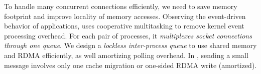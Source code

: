 

To handle many concurrent connections efficiently, we need to save memory footprint and improve locality of memory accesses. Observing the event-driven behavior of applications, \sys uses cooperative multitasking to remove kernel event processing overhead. For each pair of processes, it \textit{multiplexes socket connections through one queue}. We design a \textit{lockless inter-process queue} to use shared memory and RDMA efficiently, as well amortizing polling overhead. In \sys, sending a small message involves only one cache migration or one-sided RDMA write (amortized).



